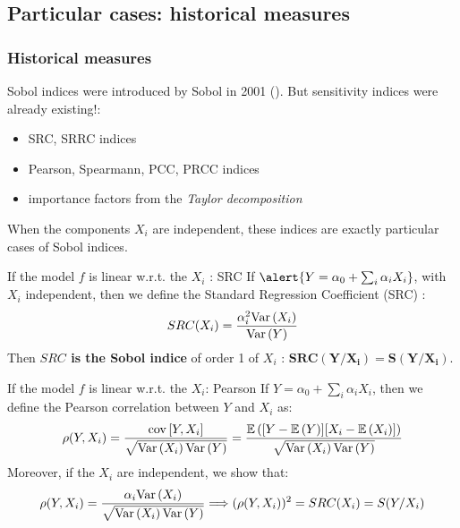 \documentclass[8pt]{beamer}
\begin{document}
\subsection{Particular cases: historical measures}

\begin{frame}
\frametitle{Historical measures}
 \small
 
 Sobol indices  were introduced by Sobol in 2001 (\cite{Sobol2001}). But sensitivity indices were already existing!:
 \begin{itemize}
  \item SRC, SRRC indices
  \item Pearson, Spearmann, PCC, PRCC indices
  \item importance factors from the \emph{Taylor decomposition}
 \end{itemize}
\alert{When the components $X_i$ are independent, these indices are exactly particular cases of Sobol indices.}

 \begin{block}{If the model $f$ is linear  w.r.t. the  $X_i$ : SRC}
  If $\alert{Y = \alpha_0 + \sum_i \alpha_i X_i}$, with \alert{ $X_i$ independent}, then we define the  \alert{ Standard Regression Coefficient (SRC)} :
    \begin{equation}
      SRC(X_i) = \displaystyle \frac{\alpha_i^2 \mbox{Var}\left( X_i \right)}{\mbox{Var}\left( Y \right)}
    \end{equation}
    Then {\bf $SRC $ is the Sobol indice} of order 1 of $X_i$ : $\boldsymbol{    SRC (Y / X_i) = S(Y / X_i)}$.
 \end{block}

 
\begin{block}{If the model $f$ is linear  w.r.t. the  $X_i$: Pearson}
 If  \alert{$Y=\alpha_0 + \sum_i \alpha_i X_i$}, then we define the \alert{ Pearson correlation} between $Y$ and $X_i$ as:
   \begin{equation}
    \rho(Y,X_i) =  \dfrac{{\rm cov}\left[Y,X_i \right]}{\sqrt{\mbox{Var}\left( X_i \right)\mbox{Var}\left( Y \right)}} = \dfrac{\mathbb{E}\left( [Y-\mathbb{E}\left( Y \right)][X_i - \mathbb{E}\left( X_i \right)] \right)}{\sqrt{\mbox{Var}\left( X_i \right)\mbox{Var}\left( Y \right)}}
  \end{equation}
Moreover, if the  \alert{ $X_i$ are independent}, we show that:
  $$
  \rho(Y,X_i) = \dfrac{\alpha_i \mbox{Var}\left( X_i \right)}{\sqrt{\mbox{Var}\left( X_i \right)\mbox{Var}\left( Y \right)}} \Longrightarrow (\rho(Y,X_i))^2 = SRC(X_i) = S(Y/X_i)
  $$
  \end{block}
\end{frame}
 
\end{document}

